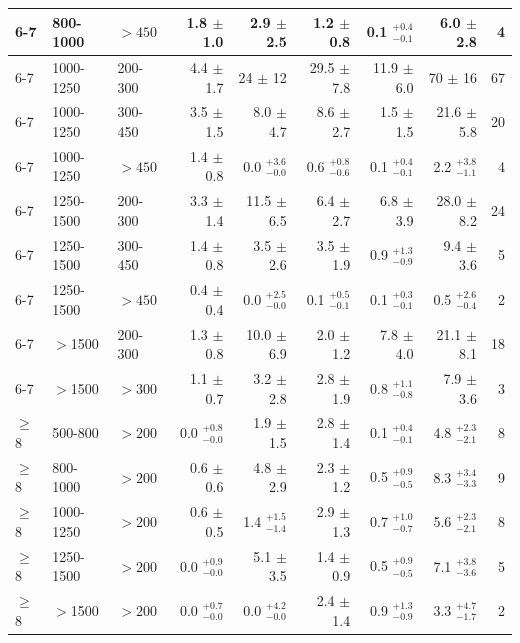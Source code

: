 \begin{table}[!t]
{\begin{tabular}{lll|r|r|r|r|r|r}
      6-7     & 800-1000   & $>450$   &    1.8 $\pm$    1.0       &    2.9 $\pm$    2.5      &   1.2 $\pm$    0.8      &  0.1 $^{+0.4}_{-0.1}$       & 6.0    $\pm$    2.8    &     4  \\ \hline
      6-7     & 1000-1250  & 200-300  &    4.4 $\pm$    1.7       &   24   $\pm$   12        &  29.5 $\pm$    7.8      & 11.9 $\pm$    6.0       &  70    $\pm$   16      &    67  \\
      6-7     & 1000-1250  & 300-450  &    3.5 $\pm$    1.5       &    8.0 $\pm$    4.7      &   8.6 $\pm$    2.7      &  1.5 $\pm$    1.5       & 21.6   $\pm$    5.8    &    20  \\
      6-7     & 1000-1250  & $>450$   &    1.4 $\pm$    0.8       &    0.0 $^{+3.6}_{-0.0}$      &   0.6 $^{+0.8}_{-0.6}$      &  0.1 $^{+0.4}_{-0.1}$       & 2.2    $^{+3.8}_{-1.1}$    &     4  \\ \hline
      6-7     & 1250-1500  & 200-300  &    3.3 $\pm$    1.4       &   11.5 $\pm$    6.5      &   6.4 $\pm$    2.7      &  6.8 $\pm$    3.9       & 28.0   $\pm$    8.2    &    24  \\
      6-7     & 1250-1500  & 300-450  &    1.4 $\pm$    0.8       &    3.5 $\pm$    2.6      &   3.5 $\pm$    1.9      &  0.9 $^{+1.3}_{-0.9}$       & 9.4    $\pm$    3.6    &     5  \\
      6-7     & 1250-1500  & $>450$   &    0.4 $\pm$    0.4       &    0.0 $^{+2.5}_{-0.0}$      &   0.1 $^{+0.5}_{-0.1}$      &  0.1 $^{+0.3}_{-0.1}$       & 0.5    $^{+2.6}_{-0.4}$    &     2  \\ \hline
      6-7     & $>$1500    & 200-300  &    1.3 $\pm$    0.8       &   10.0 $\pm$    6.9      &   2.0 $\pm$    1.2      &  7.8 $\pm$    4.0       & 21.1   $\pm$    8.1    &    18  \\
      6-7     & $>$1500    & $>300$   &    1.1 $\pm$    0.7       &    3.2 $\pm$    2.8      &   2.8 $\pm$    1.9      &  0.8 $^{+1.1}_{-0.8}$       & 7.9    $\pm$    3.6    &     3  \\ \hline \hline 
      $\geq$8 & 500-800    & $>200$   &    0.0 $^{+0.8}_{-0.0}$       &    1.9 $\pm$    1.5      &   2.8 $\pm$    1.4      &  0.1 $^{+0.4}_{-0.1}$       & 4.8    $^{+2.3}_{-2.1}$    &     8  \\
      $\geq$8 & 800-1000   & $>200$   &    0.6 $\pm$    0.6       &    4.8 $\pm$    2.9      &   2.3 $\pm$    1.2      &  0.5 $^{+0.9}_{-0.5}$       & 8.3    $^{+3.4}_{-3.3}$    &     9  \\
      $\geq$8 & 1000-1250  & $>200$   &    0.6 $\pm$    0.5       &    1.4 $^{+1.5}_{-1.4}$      &   2.9 $\pm$    1.3      &  0.7 $^{+1.0}_{-0.7}$       & 5.6    $^{+2.3}_{-2.1}$    &     8  \\
      $\geq$8 & 1250-1500  & $>200$   &    0.0 $^{+0.9}_{-0.0}$       &    5.1 $\pm$    3.5      &   1.4 $\pm$    0.9      &  0.5 $^{+0.9}_{-0.5}$       & 7.1    $^{+3.8}_{-3.6}$    &     5  \\
      $\geq$8 & $>$1500    & $>200$   &    0.0 $^{+0.7}_{-0.0}$       &    0.0 $^{+4.2}_{-0.0}$      &   2.4 $\pm$    1.4      &  0.9 $^{+1.3}_{-0.9}$       & 3.3    $^{+4.7}_{-1.7}$    &     2  \\ \hline \hline



\end{tabular}}
\end{table}
